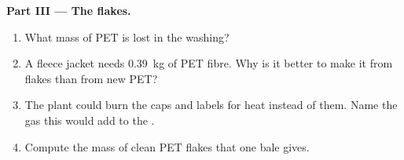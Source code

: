 \begin{problem}
\medskip
\noindent\textbf{Part III --- The flakes.}
\begin{enumerate}[resume]
  \item What mass of PET is lost in the washing?
  \item A fleece jacket needs \qty{0.39}{kg} of PET fibre. Why is it
        better to make it from flakes than from new PET?
  \item The plant could burn the caps and labels for heat instead of
         them. Name the gas this would add to the .
  \item Compute the mass of clean PET flakes that one bale gives.
\end{enumerate}
\end{problem}
